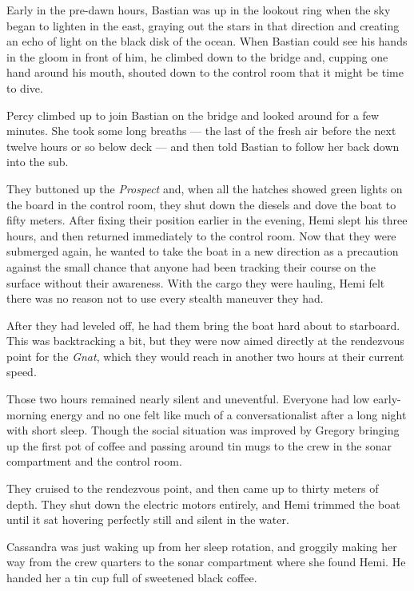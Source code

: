 \documentclass[
]{scrbook}
\begin{document}
\bigskip

Early in the pre-dawn hours, Bastian was up in the lookout ring when the
sky began to lighten in the east, graying out the stars in that
direction and creating an echo of light on the black disk of the ocean.
When Bastian could see his hands in the gloom in front of him, he
climbed down to the bridge and, cupping one hand around his mouth,
shouted down to the control room that it might be time to dive.

Percy climbed up to join Bastian on the bridge and looked around for a
few minutes. She took some long breaths --- the last of the fresh air
before the next twelve hours or so below deck --- and then told Bastian
to follow her back down into the sub.

They buttoned up the \emph{Prospect} and, when all the hatches showed
green lights on the board in the control room, they shut down the
diesels and dove the boat to fifty meters. After fixing their position
earlier in the evening, Hemi slept his three hours, and then returned
immediately to the control room. Now that they were submerged again, he
wanted to take the boat in a new direction as a precaution against the
small chance that anyone had been tracking their course on the surface
without their awareness. With the cargo they were hauling, Hemi felt
there was no reason not to use every stealth maneuver they had.

After they had leveled off, he had them bring the boat hard about to
starboard. This was backtracking a bit, but they were now aimed directly
at the rendezvous point for the \emph{Gnat}, which they would reach in
another two hours at their current speed.

Those two hours remained nearly silent and uneventful. Everyone had low
early-morning energy and no one felt like much of a conversationalist
after a long night with short sleep. Though the social situation was
improved by Gregory bringing up the first pot of coffee and passing
around tin mugs to the crew in the sonar compartment and the control
room.

They cruised to the rendezvous point, and then came up to thirty meters
of depth. They shut down the electric motors entirely, and Hemi trimmed
the boat until it sat hovering perfectly still and silent in the water.

Cassandra was just waking up from her sleep rotation, and groggily
making her way from the crew quarters to the sonar compartment where she
found Hemi. He handed her a tin cup full of sweetened black coffee.
\end{document}
